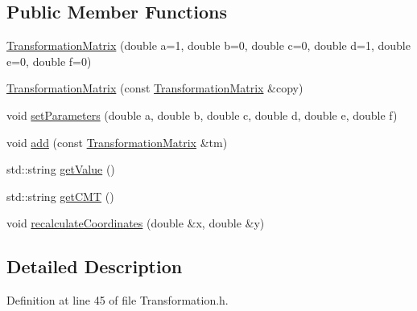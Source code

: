 \subsection*{Public Member Functions}
\begin{DoxyCompactItemize}
\item 
\hyperlink{classmerge__lib_1_1_transformation_matrix_ab4bdb2306e84a7541f9295885f5f2064}{Transformation\-Matrix} (double a=1, double b=0, double c=0, double d=1, double e=0, double f=0)
\item 
\hyperlink{classmerge__lib_1_1_transformation_matrix_ae1da31886dfb24c50867c2329f87a69f}{Transformation\-Matrix} (const \hyperlink{classmerge__lib_1_1_transformation_matrix}{Transformation\-Matrix} \&copy)
\item 
void \hyperlink{classmerge__lib_1_1_transformation_matrix_a68355a7bba02700ddc35e1eff090ecf5}{set\-Parameters} (double a, double b, double c, double d, double e, double f)
\item 
void \hyperlink{classmerge__lib_1_1_transformation_matrix_a8784873ef512545d240ae5d721919df9}{add} (const \hyperlink{classmerge__lib_1_1_transformation_matrix}{Transformation\-Matrix} \&tm)
\item 
std\-::string \hyperlink{classmerge__lib_1_1_transformation_matrix_ab925e196201af200deab259ff1b57155}{get\-Value} ()
\item 
std\-::string \hyperlink{classmerge__lib_1_1_transformation_matrix_a53fcc8cfebdc7855b700ea3312462ebd}{get\-C\-M\-T} ()
\item 
void \hyperlink{classmerge__lib_1_1_transformation_matrix_adc7b7e9b0e34d5cb7d93c19f23670bc3}{recalculate\-Coordinates} (double \&x, double \&y)
\end{DoxyCompactItemize}


\subsection{Detailed Description}


Definition at line 45 of file Transformation.\-h.



